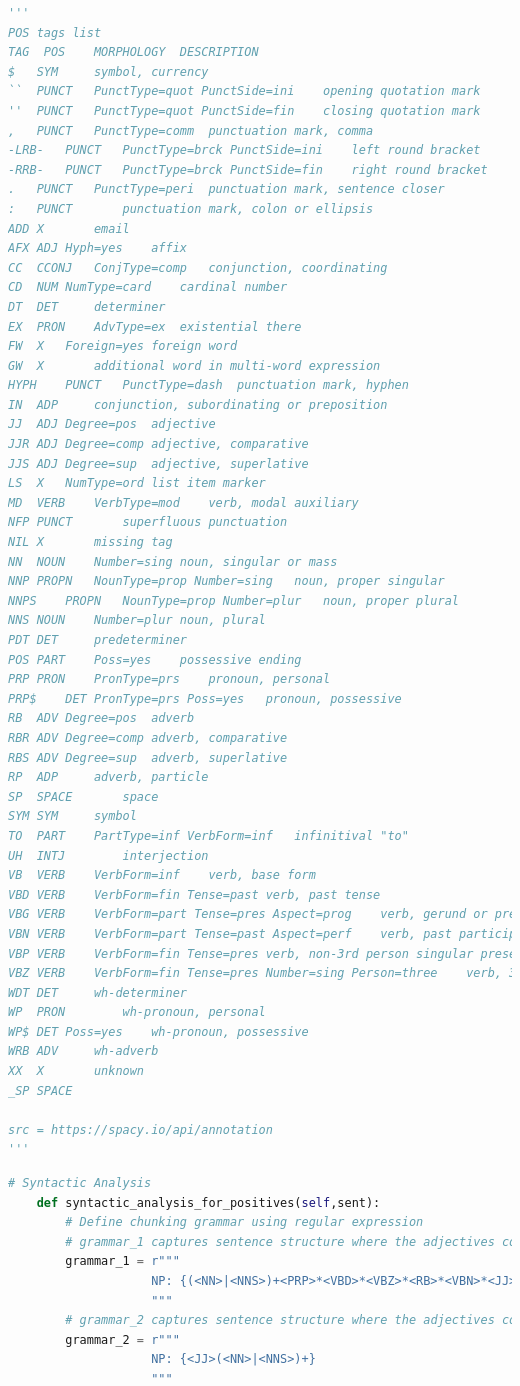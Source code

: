 \documentclass[a4paper]{report}
\begin{document}
{{\begin{lstlisting}[language=Python,label={lst:POS-tag},caption={POS Tags} ]
'''
POS tags list
TAG	 POS	MORPHOLOGY	DESCRIPTION
$	SYM		symbol, currency
``	PUNCT	PunctType=quot PunctSide=ini	opening quotation mark
''	PUNCT	PunctType=quot PunctSide=fin	closing quotation mark
,	PUNCT	PunctType=comm	punctuation mark, comma
-LRB-	PUNCT	PunctType=brck PunctSide=ini	left round bracket
-RRB-	PUNCT	PunctType=brck PunctSide=fin	right round bracket
.	PUNCT	PunctType=peri	punctuation mark, sentence closer
:	PUNCT		punctuation mark, colon or ellipsis
ADD	X		email
AFX	ADJ	Hyph=yes	affix
CC	CCONJ	ConjType=comp	conjunction, coordinating
CD	NUM	NumType=card	cardinal number
DT	DET		determiner
EX	PRON	AdvType=ex	existential there
FW	X	Foreign=yes	foreign word
GW	X		additional word in multi-word expression
HYPH	PUNCT	PunctType=dash	punctuation mark, hyphen
IN	ADP		conjunction, subordinating or preposition
JJ	ADJ	Degree=pos	adjective
JJR	ADJ	Degree=comp	adjective, comparative
JJS	ADJ	Degree=sup	adjective, superlative
LS	X	NumType=ord	list item marker
MD	VERB	VerbType=mod	verb, modal auxiliary
NFP	PUNCT		superfluous punctuation
NIL	X		missing tag
NN	NOUN	Number=sing	noun, singular or mass
NNP	PROPN	NounType=prop Number=sing	noun, proper singular
NNPS	PROPN	NounType=prop Number=plur	noun, proper plural
NNS	NOUN	Number=plur	noun, plural
PDT	DET		predeterminer
POS	PART	Poss=yes	possessive ending
PRP	PRON	PronType=prs	pronoun, personal
PRP$	DET	PronType=prs Poss=yes	pronoun, possessive
RB	ADV	Degree=pos	adverb
RBR	ADV	Degree=comp	adverb, comparative
RBS	ADV	Degree=sup	adverb, superlative
RP	ADP		adverb, particle
SP	SPACE		space
SYM	SYM		symbol
TO	PART	PartType=inf VerbForm=inf	infinitival "to"
UH	INTJ		interjection
VB	VERB	VerbForm=inf	verb, base form
VBD	VERB	VerbForm=fin Tense=past	verb, past tense
VBG	VERB	VerbForm=part Tense=pres Aspect=prog	verb, gerund or present participle
VBN	VERB	VerbForm=part Tense=past Aspect=perf	verb, past participle
VBP	VERB	VerbForm=fin Tense=pres	verb, non-3rd person singular present
VBZ	VERB	VerbForm=fin Tense=pres Number=sing Person=three	verb, 3rd person singular present
WDT	DET		wh-determiner
WP	PRON		wh-pronoun, personal
WP$	DET	Poss=yes	wh-pronoun, possessive
WRB	ADV		wh-adverb
XX	X		unknown
_SP	SPACE	

src = https://spacy.io/api/annotation
'''
\end{lstlisting}

\begin{lstlisting}[language=Python,label={lst:grammar_chunking},caption={Grammars used for chunking in reviews in Syntactic Analysis.} ]
    # Syntactic Analysis
    def syntactic_analysis_for_positives(self,sent):
        # Define chunking grammar using regular expression
        # grammar_1 captures sentence structure where the adjectives comes after the nouns
        grammar_1 = r"""
                    NP: {(<NN>|<NNS>)+<PRP>*<VBD>*<VBZ>*<RB>*<VBN>*<JJ>*((<CC><VBD>+)|(<CC><RB>+<JJ>*)|(<CC><VBN>+)|(<CC><JJ>+))*}
                    """
        # grammar_2 captures sentence structure where the adjectives comes before the nouns
        grammar_2 = r"""
                    NP: {<JJ>(<NN>|<NNS>)+}
                    """


\end{lstlisting}}}
\end{document}
